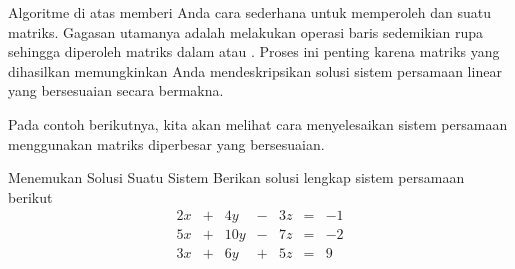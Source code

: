 Algoritme di atas memberi Anda cara sederhana untuk memperoleh \ef \;dan \rref \;suatu matriks.
Gagasan utamanya adalah melakukan operasi baris sedemikian rupa sehingga diperoleh
matriks dalam \ef \;atau \rref. Proses ini penting karena matriks yang dihasilkan
memungkinkan Anda mendeskripsikan
solusi sistem persamaan linear yang bersesuaian secara bermakna.

Pada contoh berikutnya, kita akan melihat cara menyelesaikan sistem persamaan menggunakan matriks diperbesar yang bersesuaian.

\begin{example}{Menemukan Solusi Suatu Sistem}\label{exa:systemwithnosoln}
Berikan solusi lengkap sistem persamaan berikut \:
\begin{equation*}
\begin{array}{ccccccccc}
2x&+&4y&-&3z&=&-1\\
5x&+&10y&-&7z&=&-2\\
3x&+&6y&+&5z&=&9
\end{array}
\end{equation*}
\end{example}

